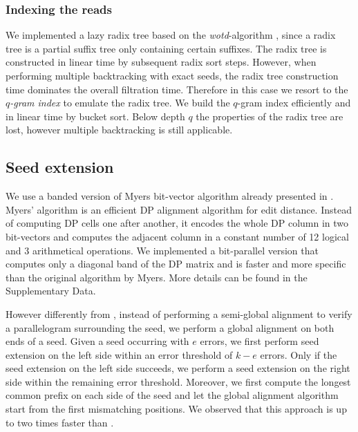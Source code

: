 \subsubsection{Indexing the reads}

We implemented a lazy radix tree based on the \emph{wotd}-algorithm \citep{Giegerich1999}, since a radix tree is a partial suffix tree only containing certain suffixes. The radix tree is constructed in linear time by subsequent radix sort steps.
However, when performing multiple backtracking with exact seeds, the radix tree construction time dominates the overall filtration time.
Therefore in this case we resort to the \emph{$q$-gram index} to emulate the radix tree.
We build the $q$-gram index efficiently and in linear time by bucket sort.
Below depth $q$ the properties of the radix tree are lost, however multiple backtracking is still applicable.

\subsection{Seed extension}

We use a banded version of Myers bit-vector algorithm \citep{Myers1999} already presented in \citep{Razers3}.
Myers' algorithm is an efficient DP alignment algorithm \citep{Needleman1970} for edit distance. 
Instead of computing DP cells one after another, it encodes the whole DP column in two bit-vectors and computes the adjacent column in a constant number of 12 logical and 3 arithmetical operations.
We implemented a bit-parallel version that computes only a diagonal band of the DP matrix and is faster and more specific than the original algorithm by Myers.
More details can be found in the Supplementary Data.

However differently from \citep{Razers3}, instead of performing a semi-global alignment to verify a parallelogram surrounding the seed, we perform a global alignment on both ends of a seed.
Given a seed occurring with $e$ errors, we first perform seed extension on the left side within an error threshold of $k - e$ errors.
Only if the seed extension on the left side succeeds, we perform a seed extension on the right side within the remaining error threshold.
Moreover, we first compute the longest common prefix on each side of the seed and let the global alignment algorithm start from the first mismatching positions.
We observed that this approach is up to two times faster than \citep{Razers3}.


